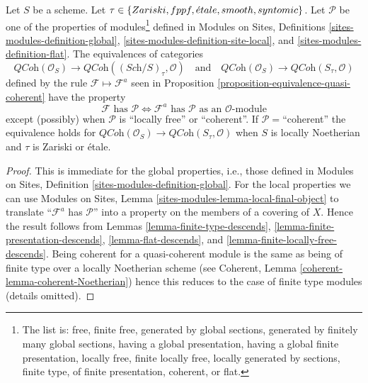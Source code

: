 \begin{lemma}
\label{lemma-equivalence-quasi-coherent-properties}
Let $S$ be a scheme.
Let $\tau \in \{Zariski,\linebreak[0] fppf,\linebreak[0]
\acute{e}tale,\linebreak[0] smooth,\linebreak[0] syntomic\}$.
Let $\mathcal{P}$ be one of the properties of modules\footnote{The list is:
free, finite free, generated by global sections, generated by finitely
many global sections, having a global presentation,
having a global finite presentation, locally free, finite locally free,
locally generated by sections, finite type, of finite presentation,
coherent, or flat.} defined in
Modules on Sites, Definitions \ref{sites-modules-definition-global},
\ref{sites-modules-definition-site-local}, and
\ref{sites-modules-definition-flat}.
The equivalences of categories
$$
\textit{QCoh}(\mathcal{O}_S)
\longrightarrow 
\textit{QCoh}((\textit{Sch}/S)_\tau, \mathcal{O})
\quad\text{and}\quad
\textit{QCoh}(\mathcal{O}_S)
\longrightarrow 
\textit{QCoh}(S_\tau, \mathcal{O})
$$
defined by the rule $\mathcal{F} \mapsto \mathcal{F}^a$ seen in
Proposition \ref{proposition-equivalence-quasi-coherent}
have the property
$$
\mathcal{F}\text{ has }\mathcal{P}
\Leftrightarrow
\mathcal{F}^a\text{ has }\mathcal{P}\text{ as an }\mathcal{O}\text{-module}
$$
except (possibly) when $\mathcal{P}$ is ``locally free'' or ``coherent''.
If $\mathcal{P}=$``coherent'' the equivalence
holds for $\textit{QCoh}(\mathcal{O}_S) \to \textit{QCoh}(S_\tau, \mathcal{O})$
when $S$ is locally Noetherian and $\tau$ is Zariski or \'etale.
\end{lemma}

\begin{proof}
This is immediate for the global properties, i.e., those defined in
Modules on Sites, Definition \ref{sites-modules-definition-global}.
For the local properties we can use
Modules on Sites, Lemma \ref{sites-modules-lemma-local-final-object}
to translate ``$\mathcal{F}^a$ has $\mathcal{P}$'' into a property
on the members of a covering of $X$. Hence the result follows from
Lemmas \ref{lemma-finite-type-descends},
\ref{lemma-finite-presentation-descends},
\ref{lemma-flat-descends}, and
\ref{lemma-finite-locally-free-descends}.
Being coherent for a quasi-coherent module is the same as being
of finite type over a locally Noetherian scheme (see
Coherent, Lemma \ref{coherent-lemma-coherent-Noetherian})
hence this reduces
to the case of finite type modules (details omitted).
\end{proof}

